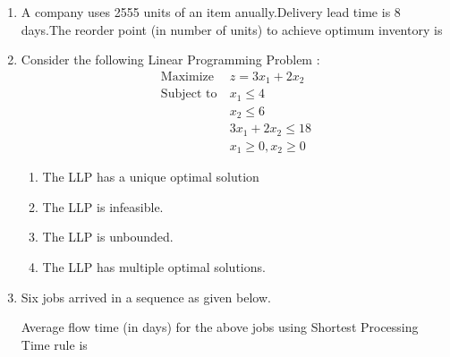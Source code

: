 \documentclass[journal]{IEEEtran}
\begin{document}
\begin{enumerate}
\begin{enumerate}
\end{enumerate}
\item A company uses 2555 units of an item anually.Delivery lead time is 8 days.The reorder point (in number of units) to achieve optimum inventory is 
\begin{enumerate}
\end{enumerate}
\item Consider the following Linear Programming Problem  :
	\begin{align}
		\text{Maximize} &\ z = 3x_1+2x_2 \\
		\text{Subject to} &\ x_1 \le 4 \\
		&\ x_2 \le 6 \\
		&\  3x_1+2x_2 \le 18 \\
		&\ x_1 \ge 0, x_2 \ge 0  
	\end{align}
\begin{enumerate}
\item The LLP has a unique optimal solution 
\item The LLP is infeasible.
\item The LLP is unbounded.
\item The LLP has multiple optimal solutions.
\end{enumerate}
\item Six jobs arrived in a sequence as given below.
\begin{table}[h!]
        \centering
  
\end{table}
Average flow time (in days) for the above jobs using Shortest Processing Time rule is 
\begin{enumerate}

\end{enumerate}
\end{enumerate}
\end{document}
